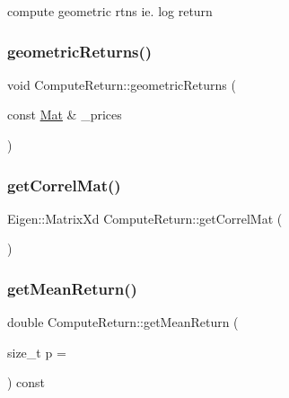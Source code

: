compute geometric rtns ie. log return 

\hypertarget{classComputeReturn_a2d55b2a2037f25e9a7a617af91b56272}{}\label{classComputeReturn_a2d55b2a2037f25e9a7a617af91b56272} 
\subsubsection{\texorpdfstring{geometric\+Returns()}{geometricReturns()}\hspace{0.1cm}{\footnotesize\ttfamily [2/2]}}
{\footnotesize\ttfamily void Compute\+Return\+::geometric\+Returns (\begin{DoxyParamCaption}\item[{const \hyperlink{compute__returns__eigen_8h_ae14dd28696f743e067dbd2594616bad6}{Mat} \&}]{\+\_\+prices }\end{DoxyParamCaption})}

\hypertarget{classComputeReturn_a16b185325ca2cb87991b6db59aa63de8}{}\label{classComputeReturn_a16b185325ca2cb87991b6db59aa63de8} 
\subsubsection{\texorpdfstring{get\+Correl\+Mat()}{getCorrelMat()}}
{\footnotesize\ttfamily Eigen\+::\+Matrix\+Xd Compute\+Return\+::get\+Correl\+Mat (\begin{DoxyParamCaption}{ }\end{DoxyParamCaption})}

\hypertarget{classComputeReturn_ab83426d16e1c870e18278db3d6b4deeb}{}\label{classComputeReturn_ab83426d16e1c870e18278db3d6b4deeb} 
\subsubsection{\texorpdfstring{get\+Mean\+Return()}{getMeanReturn()}}
{\footnotesize\ttfamily double Compute\+Return\+::get\+Mean\+Return (\begin{DoxyParamCaption}\item[{size\+\_\+t}]{p = {} }\end{DoxyParamCaption}) const}

